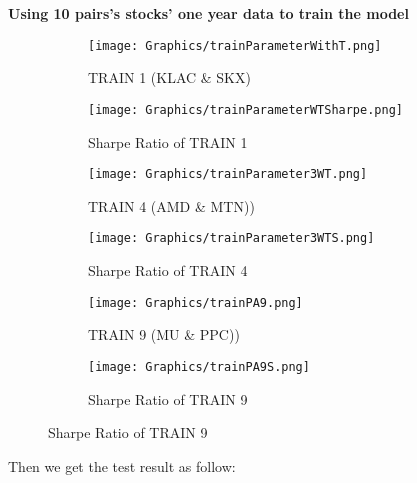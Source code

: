 \textbf{Using 10 pairs’s stocks’ one year data to train the model} 
\begin{figure}[H]
\begin{subfigure}{.5\textwidth}%
\centering
\texttt{[image: Graphics/trainParameterWithT.png]} \caption{TRAIN 1 (KLAC \& SKX)
} 
\end{subfigure}%
\begin{subfigure}{.5\textwidth}%
\centering
\texttt{[image: Graphics/trainParameterWTSharpe.png]} \caption{Sharpe Ratio of TRAIN 1}
\end{subfigure}%
\vspace{0.1cm}
\begin{subfigure}{.5\textwidth}%
\centering
\texttt{[image: Graphics/trainParameter3WT.png]} \caption{TRAIN 4 (AMD \& MTN))} 
\end{subfigure}%
\begin{subfigure}{.5\textwidth}%
\centering
\texttt{[image: Graphics/trainParameter3WTS.png]} \caption{Sharpe Ratio of TRAIN 4}
\end{subfigure}%
\vspace{0.1cm}
\begin{subfigure}{.5\textwidth}%
\centering
\texttt{[image: Graphics/trainPA9.png]} \caption{TRAIN 9 (MU \& PPC))} 
\end{subfigure}%
\begin{subfigure}{.5\textwidth}%
\centering
\texttt{[image: Graphics/trainPA9S.png]} \caption{Sharpe Ratio of TRAIN 9}
\end{subfigure}%
\end{figure}

\newpage
Then we get the test result as follow:

